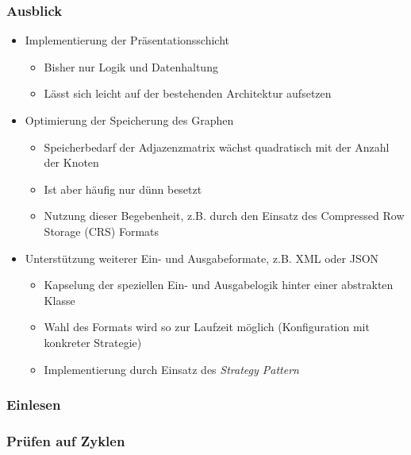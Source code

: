 \documentclass[ngerman, t]{beamer}
\begin{document}
\begin{frame}
  \frametitle{Ausblick}
  \begin{itemize}
    \item Implementierung der Pr\"asentationsschicht
      \begin{itemize}
        \item Bisher nur Logik und Datenhaltung
        \item L\"asst sich leicht auf der bestehenden Architektur
          aufsetzen
      \end{itemize}
    \item Optimierung der Speicherung des Graphen
      \begin{itemize}
        \item Speicherbedarf der Adjazenzmatrix w\"achst quadratisch
          mit der Anzahl der Knoten
        \item Ist aber h\"aufig nur d\"unn besetzt
        \item Nutzung dieser Begebenheit, z.B. durch den Einsatz des
          Compressed Row Storage (CRS) Formats
      \end{itemize}
    \item Unterst\"utzung weiterer Ein- und Ausgabeformate, z.B. XML
      oder JSON
      \begin{itemize}
        \item Kapselung der speziellen Ein- und Ausgabelogik hinter
          einer abstrakten Klasse
        \item Wahl des Formats wird so zur Laufzeit m\"oglich
          (Konfiguration mit konkreter Strategie)
        \item Implementierung durch Einsatz des \textit{Strategy Pattern}
      \end{itemize}
  \end{itemize}
\end{frame}

\begin{frame}

\end{frame}

\begin{frame}
  \frametitle{Einlesen}
  \begin{figure}
    \resizebox{!}{100px}{}
  \end{figure}
\end{frame}

\begin{frame}
  \frametitle{Pr\"ufen auf Zyklen}
  \begin{figure}
    \resizebox{!}{100px}{}
  \end{figure}
\end{frame}
\end{document}
